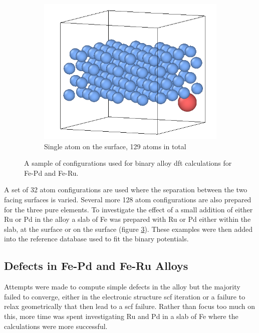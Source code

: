 \begin{figure}[htb]
\begin{subfigure}{.32\textwidth}
  \label{fig:sub-first}
\end{subfigure}
\begin{subfigure}{.32\textwidth}
  \centering
  \includegraphics[width=.94\linewidth]{chapters/potentials_fe_pd_ru/slabs/slab03.png}  
  \caption{Single atom on the surface, 129 atoms in total}
  \label{fig:sub-first}
\end{subfigure}
\caption{A sample of configurations used for binary alloy \acrshort{dft} calculations for Fe-Pd and Fe-Ru.}
\label{fig:binaryalloyconfigurationsslab}
\end{figure}

A set of 32 atom configurations are used where the separation between the two facing surfaces is varied.  Several more 128 atom configurations are also prepared for the three pure elements.  To investigate the effect of a small addition of either Ru or Pd in the alloy a slab of Fe was prepared with Ru or Pd either within the slab, at the surface or on the surface (figure \ref{fig:binaryalloyconfigurationsslab}).  These examples were then added into the reference database used to fit the binary potentials.



\FloatBarrier
\subsection{Defects in Fe-Pd and Fe-Ru Alloys}

Attempts were made to compute simple defects in the alloy but the majority failed to converge, either in the electronic structure \acrshort{scf} iteration or a failure to relax geometrically that then lead to a \acrshort{scf} failure.  Rather than focus too much on this, more time was spent investigating Ru and Pd in a slab of Fe where the calculations were more successful.




